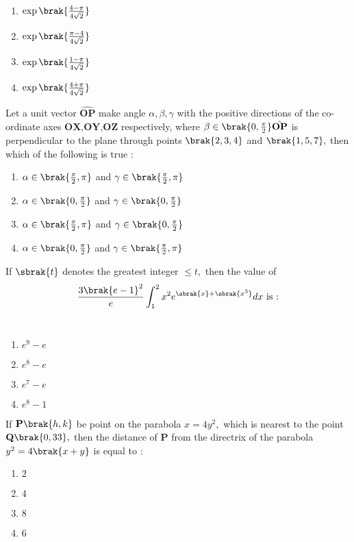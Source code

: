 	   \hfill{} \\
    \begin{enumerate}
        \item $\exp\brak{{\frac{4-\pi}{4\sqrt{2}}}}$
        \item $\exp\brak{{\frac{\pi-4}{4\sqrt{2}}}}$
        \item $\exp\brak{{\frac{1-\pi}{4\sqrt{2}}}}$
        \item $\exp\brak{{\frac{4+\pi}{4\sqrt{2}}}}$
    \end{enumerate}
    \item Let a unit vector $\hat{\textbf{OP}}$ make angle $\alpha,\beta,\gamma$ with the positive directions of the co-ordinate axes $\textbf{OX,OY,OZ}$ respectively, where $\beta \in \brak{0,\frac{\pi}{2}}\hat{\textbf{OP}}$ is perpendicular to the plane through points $\brak{2,3,4}$ and $\brak{1,5,7},$ then which of the following is true $:$
	  \hfill{}  \\
    \begin{enumerate}
        \item $\alpha\in\brak{\frac{\pi}{2},\pi}$ and $\gamma\in\brak{\frac{\pi}{2},\pi}$
        \item $\alpha\in\brak{0,\frac{\pi}{2}}$ and $\gamma\in\brak{0,\frac{\pi}{2}}$
        \item $\alpha\in\brak{\frac{\pi}{2},\pi}$ and $\gamma\in\brak{0,\frac{\pi}{2}}$
        \item $\alpha\in\brak{0,\frac{\pi}{2}}$ and $\gamma\in\brak{\frac{\pi}{2},\pi}$
    \end{enumerate}
    \item If $\sbrak{t}$ denotes the greatest integer $\le t,$ then the value of $$\frac{3\brak{e-1}^2}{e}\int_1^2x^2e^{\sbrak{x}+\sbrak{x^3}}dx \text{ is :}$$
	  \hfill{}  \\
    \begin{enumerate}
        \item $e^9-e$
        \item $e^8-e$
        \item $e^7-e$
        \item $e^8-1$
    \end{enumerate}
    \item If $\textbf{P}\brak{h,k}$ be point on the parabola $x=4y^2,$ which is nearest to the point $\textbf{Q}\brak{0,33},$ then the distance of $\textbf{P}$ from the directrix of the parabola $y^2=4\brak{x+y}$ is equal to $:$
	   \hfill{} \\
    \begin{enumerate}
        \item $2$
        \item $4$
        \item $8$
        \item $6$
    \end{enumerate}

